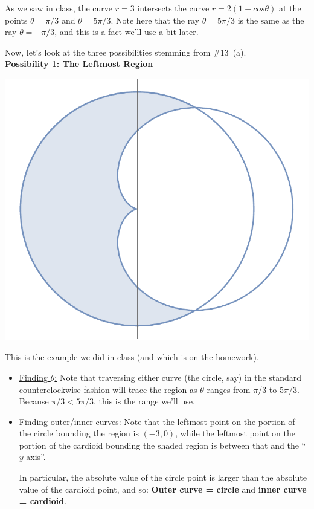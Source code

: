 \documentclass[12pt]{article}
\begin{document}
	\vspace{3mm}
	
	As we saw in class, the curve $r=3$ intersects the curve $r=2(1+cos\theta)$ at the points $\theta=\pi/3$ and $\theta=5\pi/3$. Note here that the ray $\theta=5\pi/3$ is the same as the ray $\theta=-\pi/3$, and this is a fact we'll use a bit later.
	
	Now, let's look at the three possibilities stemming from \#13~(a).\\[1.5mm]
	
	\noindent\textbf{Possibility 1: The Leftmost Region}
	
	\begin{center}
		\includegraphics[scale=0.75]{region1}
	\end{center}

	This is the example we did in class (and which is on the homework).
	
	\begin{itemize}
		\item \ul{Finding $\theta$:}  Note that traversing either curve (the circle, say) in the standard counterclockwise fashion will trace the region as $\theta$ ranges from $\pi/3$ to $5\pi/3$. Because $\pi/3 < 5\pi/3$, this is the range we'll use.
		\item \ul{Finding outer/inner curves:} Note that the leftmost point on the portion of the circle bounding the region is $(-3,0)$, while the leftmost point on the portion of the cardioid bounding the shaded region is between that and the ``$y$-axis''. 
		
		In particular, the absolute value of the circle point is larger than the absolute value of the cardioid point, and so: \textbf{Outer curve = circle} and \textbf{inner curve = cardioid}.
	\end{itemize} 
\end{document}
